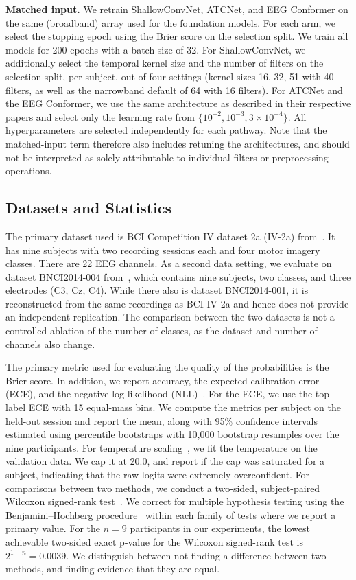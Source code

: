 \documentclass[conference]{IEEEtran}
\begin{document}
\textbf{Matched input.} We retrain ShallowConvNet, ATCNet, and EEG Conformer on the same (broadband) array used for the foundation models. For each arm, we select the stopping epoch using the Brier score on the selection split. We train all models for 200 epochs with a batch size of 32. For ShallowConvNet, we additionally select the temporal kernel size and the number of filters on the selection split, per subject, out of four settings (kernel sizes 16, 32, 51 with 40 filters, as well as the narrowband default of 64 with 16 filters). For ATCNet and the EEG Conformer, we use the same architecture as described in their respective papers and select only the learning rate from $\{10^{-2}, 10^{-3}, 3\times10^{-4}\}$. All hyperparameters are selected independently for each pathway. Note that the matched-input term therefore also includes retuning the architectures, and should not be interpreted as solely attributable to individual filters or preprocessing operations.

\subsection{Datasets and Statistics}

The primary dataset used is BCI Competition IV dataset 2a (IV-2a) from~\cite{brunner2008graz,tangermann2012competition}. It has nine subjects with two recording sessions each and four motor imagery classes. There are 22 EEG channels. As a second data setting, we evaluate on dataset BNCI2014-004 from~\cite{leeb2007bnci004}, which contains nine subjects, two classes, and three electrodes (C3, Cz, C4). While there also is dataset BNCI2014-001, it is reconstructed from the same recordings as BCI IV-2a and hence does not provide an independent replication. The comparison between the two datasets is not a controlled ablation of the number of classes, as the dataset and number of channels also change.

The primary metric used for evaluating the quality of the probabilities is the Brier score. In addition, we report accuracy, the expected calibration error (ECE), and the negative log-likelihood (NLL)~\cite{brier1950verification,gneiting2007proper}. For the ECE, we use the top label ECE with 15 equal-mass bins. We compute the metrics per subject on the held-out session and report the mean, along with 95\% confidence intervals estimated using percentile bootstraps with 10{,}000 bootstrap resamples over the nine participants. For temperature scaling~\cite{guo2017calibration}, we fit the temperature on the validation data. We cap it at 20.0, and report if the cap was saturated for a subject, indicating that the raw logits were extremely overconfident. For comparisons between two methods, we conduct a two-sided, subject-paired Wilcoxon signed-rank test~\cite{wilcoxon1945individual}. We correct for multiple hypothesis testing using the Benjamini--Hochberg procedure~\cite{benjamini1995fdr} within each family of tests where we report a primary value. For the $n = 9$ participants in our experiments, the lowest achievable two-sided exact p-value for the Wilcoxon signed-rank test is $2^{1-n} = 0.0039$. We distinguish between not finding a difference between two methods, and finding evidence that they are equal.
\end{document}
